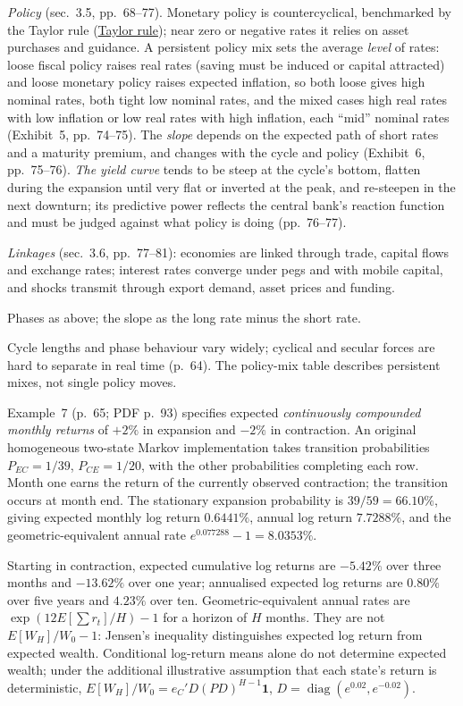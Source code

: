 \begin{qfmethod}
\emph{Policy} (sec.~3.5, pp.~68--77). Monetary policy is countercyclical, benchmarked by the Taylor rule (\hyperref[mod:taylor-rule]{Taylor rule}); near zero or negative rates it relies on asset purchases and guidance. A persistent policy mix sets the average \emph{level} of rates: loose fiscal policy raises real rates (saving must be induced or capital attracted) and loose monetary policy raises expected inflation, so both loose gives high nominal rates, both tight low nominal rates, and the mixed cases high real rates with low inflation or low real rates with high inflation, each ``mid'' nominal rates (Exhibit~5, pp.~74--75). The \emph{slope} depends on the expected path of short rates and a maturity premium, and changes with the cycle and policy (Exhibit~6, pp.~75--76). \emph{The yield curve} tends to be steep at the cycle's bottom, flatten during the expansion until very flat or inverted at the peak, and re-steepen in the next downturn; its predictive power reflects the central bank's reaction function and must be judged against what policy is doing (pp.~76--77).

\emph{Linkages} (sec.~3.6, pp.~77--81): economies are linked through trade, capital flows and exchange rates; interest rates converge under pegs and with mobile capital, and shocks transmit through export demand, asset prices and funding.

 Phases as above; the slope as the long rate minus the short rate.

 Cycle lengths and phase behaviour vary widely; cyclical and secular forces are hard to separate in real time (p.~64). The policy-mix table describes persistent mixes, not single policy moves.

 Example~7 (p.~65; PDF p.~93) specifies expected \emph{continuously compounded monthly returns} of $+2\%$ in expansion and $-2\%$ in contraction. An original homogeneous two-state Markov implementation takes transition probabilities $P_{EC}=1/39$, $P_{CE}=1/20$, with the other probabilities completing each row. Month one earns the return of the currently observed contraction; the transition occurs at month end. The stationary expansion probability is $39/59=66.10\%$, giving expected monthly log return $0.6441\%$, annual log return $7.7288\%$, and the geometric-equivalent annual rate $e^{0.077288}-1=8.0353\%$.

Starting in contraction, expected cumulative log returns are $-5.42\%$ over three months and $-13.62\%$ over one year; annualised expected log returns are $0.80\%$ over five years and $4.23\%$ over ten. Geometric-equivalent annual rates are $\exp(12E[\sum r_t]/H)-1$ for a horizon of $H$ months. They are not $E[W_H]/W_0-1$: Jensen's inequality distinguishes expected log return from expected wealth. Conditional log-return means alone do not determine expected wealth; under the additional illustrative assumption that each state's return is deterministic, $E[W_H]/W_0=e_C' D(PD)^{H-1}\mathbf1$, $D=\operatorname{diag}(e^{0.02},e^{-0.02})$.


\end{qfmethod}
